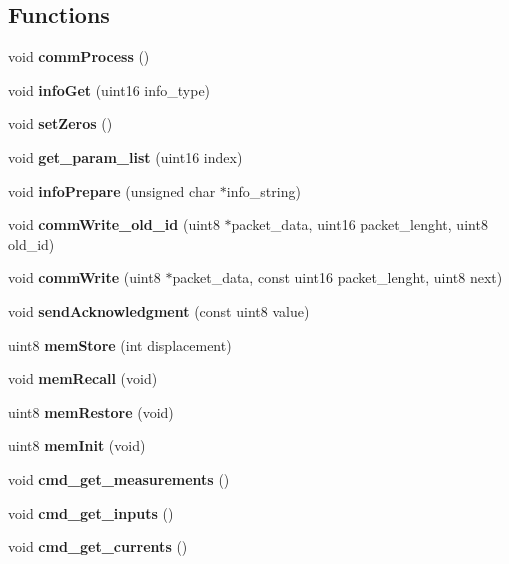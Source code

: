 \subsection*{Functions}
\begin{DoxyCompactItemize}
\item 
\mbox{\label{command__processing_8c_a2e5d1711e19837adc3e8f479af3ae509}} 
void {\bfseries comm\+Process} ()
\item 
\mbox{\label{command__processing_8c_a525ccbc7ac3901d938dc352172ee2531}} 
void {\bfseries info\+Get} (uint16 info\+\_\+type)
\item 
\mbox{\label{command__processing_8c_ac8969cb5fdb4916f259075029741e727}} 
void {\bfseries set\+Zeros} ()
\item 
\mbox{\label{command__processing_8c_a5ef086c932682ca5f7549b74ead732aa}} 
void {\bfseries get\+\_\+param\+\_\+list} (uint16 index)
\item 
\mbox{\label{command__processing_8c_abacf855ed80e3052a5bb5b243a0d809e}} 
void {\bfseries info\+Prepare} (unsigned char $\ast$info\+\_\+string)
\item 
\mbox{\label{command__processing_8c_a517f4c61166381d40767fce9011e3c96}} 
void {\bfseries comm\+Write\+\_\+old\+\_\+id} (uint8 $\ast$packet\+\_\+data, uint16 packet\+\_\+lenght, uint8 old\+\_\+id)
\item 
\mbox{\label{command__processing_8c_a1a4919b18b8f9ea21abebd5836a8f35a}} 
void {\bfseries comm\+Write} (uint8 $\ast$packet\+\_\+data, const uint16 packet\+\_\+lenght, uint8 next)
\item 
\mbox{\label{command__processing_8c_af4a42b25376d2efd09096cbbed2fbce4}} 
void {\bfseries send\+Acknowledgment} (const uint8 value)
\item 
uint8 \textbf{ mem\+Store} (int displacement)
\item 
void \textbf{ mem\+Recall} (void)
\item 
uint8 \textbf{ mem\+Restore} (void)
\item 
uint8 \textbf{ mem\+Init} (void)
\item 
void \textbf{ cmd\+\_\+get\+\_\+measurements} ()
\item 
\mbox{\label{command__processing_8c_a20db4694e8caa572ec479f73ce8b3b02}} 
void {\bfseries cmd\+\_\+get\+\_\+inputs} ()
\item 
\mbox{\label{command__processing_8c_aaf613e251c1e14fe4fffe3e9e033f9f7}} 
void {\bfseries cmd\+\_\+get\+\_\+currents} ()
\item 
\mbox{\label{command__processing_8c_a45a90a8455bfdb6a7f0e118da2c6f0a6}} 

\end{DoxyCompactItemize}
